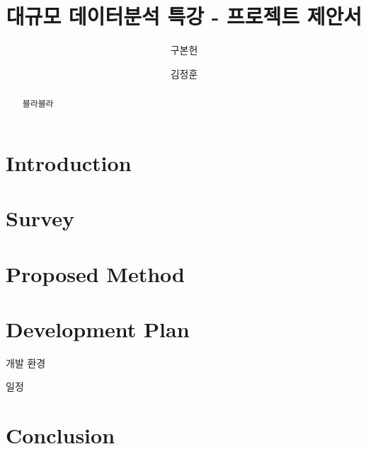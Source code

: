 \documentclass[sigconf, screen]{acmart}
\begin{document}
\title[Super Mario RL]{대규모 데이터분석 특강 - 프로젝트 제안서}

\author{구본헌}

\author{김정훈}

\begin{abstract}
블라블라
\end{abstract}


\maketitle
\section{Introduction}


\section{Survey}







\section{Proposed Method}

\section{Development Plan}
개발 환경

일정

\section{Conclusion}
\label{sec:conclusion}


\newpage
\balance


\end{document}
